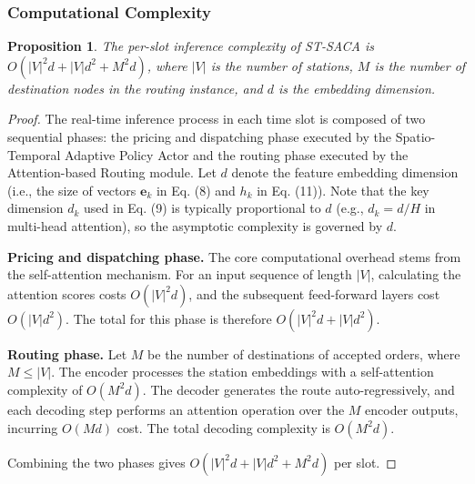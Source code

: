 \documentclass[lettersize,journal]{IEEEtran}
\newtheorem{proposition}{Proposition}
\begin{document}
\subsubsection{Computational Complexity}
\begin{proposition}
The per-slot inference complexity of ST-SACA is $O(|V|^2 d + |V| d^2 + M^2 d)$, where $|V|$ is the number of stations, $M$ is the number of destination nodes in the routing instance, and $d$ is the embedding dimension.
\end{proposition}
\begin{proof}
The real-time inference process in each time slot is composed of two sequential phases: the pricing and dispatching phase executed by the Spatio-Temporal Adaptive Policy Actor and the routing phase executed by the Attention-based Routing module. Let $d$ denote the feature embedding dimension (i.e., the size of vectors $\mathbf{e}_k$ in Eq. (8) and $h_k$ in Eq. (11)). Note that the key dimension $d_k$ used in Eq. (9) is typically proportional to $d$ (e.g., $d_k = d/H$ in multi-head attention), so the asymptotic complexity is governed by $d$.

\textbf{Pricing and dispatching phase.} The core computational overhead stems from the self-attention mechanism. For an input sequence of length $|V|$, calculating the attention scores costs $O(|V|^2 d)$, and the subsequent feed-forward layers cost $O(|V| d^2)$. The total for this phase is therefore $O(|V|^2 d + |V| d^2)$.

\textbf{Routing phase.} Let $M$ be the number of destinations of accepted orders, where $M \leq |V|$. The encoder processes the station embeddings with a self-attention complexity of $O(M^2 d)$. The decoder generates the route auto-regressively, and each decoding step performs an attention operation over the $M$ encoder outputs, incurring $O(M d)$ cost. The total decoding complexity is $O(M^2 d)$.

Combining the two phases gives $O(|V|^2 d + |V| d^2 + M^2 d)$ per slot.
\end{proof}
\end{document}
